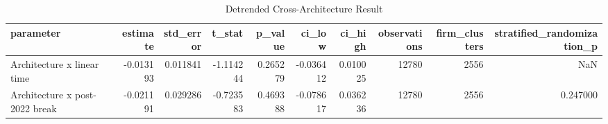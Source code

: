 \begin{table}
\caption{Detrended Cross-Architecture Result}
\label{tab:table1_detrended_result}
\begin{tabular}{lrrrrrrrrr}
\toprule
parameter & estimate & std_error & t_stat & p_value & ci_low & ci_high & observations & firm_clusters & stratified_randomization_p \\
\midrule
Architecture x linear time & -0.013193 & 0.011841 & -1.114244 & 0.265279 & -0.036412 & 0.010025 & 12780 & 2556 & NaN \\
Architecture x post-2022 break & -0.021191 & 0.029286 & -0.723583 & 0.469388 & -0.078617 & 0.036236 & 12780 & 2556 & 0.247000 \\
\bottomrule
\end{tabular}
\end{table}
